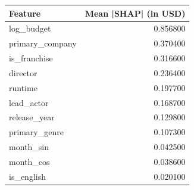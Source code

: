 \begin{tabular}{lr}
\toprule
Feature & Mean |SHAP| (ln USD) \\
\midrule
log\_budget & 0.856800 \\
primary\_company & 0.370400 \\
is\_franchise & 0.316600 \\
director & 0.236400 \\
runtime & 0.197700 \\
lead\_actor & 0.168700 \\
release\_year & 0.129800 \\
primary\_genre & 0.107300 \\
month\_sin & 0.042500 \\
month\_cos & 0.038600 \\
is\_english & 0.020100 \\
\bottomrule
\end{tabular}

